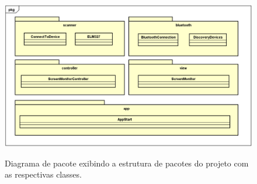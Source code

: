 \begin{figure}[!ht]
\centering
\caption{Diagrama de pacote exibindo a estrutura de pacotes do projeto com as respectivas classes.} 
{\includegraphics[scale=.42]{imagens/estruturacaoPacotes.PNG}}\\
 \label{Fig:diagrama_classe}
\end{figure}

